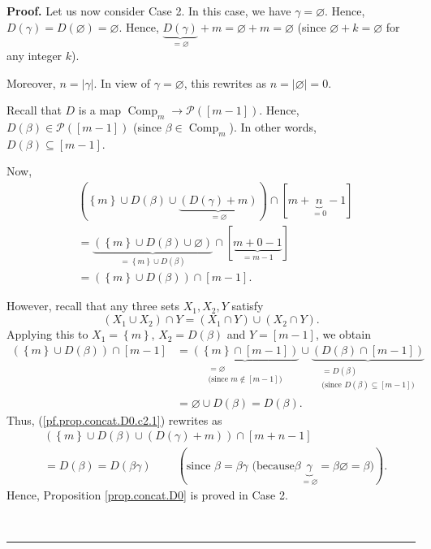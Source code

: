 \documentclass[numbers=enddot,12pt,final,onecolumn,notitlepage]{scrartcl}%
\theoremstyle{definition}
\newenvironment{proof}[1][Proof]{\noindent\textbf{#1.} }{\ \rule{0.5em}{0.5em}}
\begin{document}
\begin{proof}
Let us now consider Case 2. In this case, we have $\gamma=\varnothing$. Hence,
$D\left(  \gamma\right)  =D\left(  \varnothing\right)  =\varnothing$. Hence,
$\underbrace{D\left(  \gamma\right)  }_{=\varnothing}+m=\varnothing
+m=\varnothing$ (since $\varnothing+k=\varnothing$ for any integer $k$).

Moreover, $n=\left\vert \gamma\right\vert $. In view of $\gamma=\varnothing$,
this rewrites as $n=\left\vert \varnothing\right\vert =0$.

Recall that $D$ is a map $\operatorname*{Comp}\nolimits_{m}\rightarrow
\mathcal{P}\left(  \left[  m-1\right]  \right)  $. Hence, $D\left(
\beta\right)  \in\mathcal{P}\left(  \left[  m-1\right]  \right)  $ (since
$\beta\in\operatorname*{Comp}\nolimits_{m}$). In other words, $D\left(
\beta\right)  \subseteq\left[  m-1\right]  $.

Now,%
\begin{align}
&  \left(  \left\{  m\right\}  \cup D\left(  \beta\right)  \cup
\underbrace{\left(  D\left(  \gamma\right)  +m\right)  }_{=\varnothing
}\right)  \cap\left[  m+\underbrace{n}_{=0}-1\right] \nonumber\\
&  =\underbrace{\left(  \left\{  m\right\}  \cup D\left(  \beta\right)
\cup\varnothing\right)  }_{=\left\{  m\right\}  \cup D\left(  \beta\right)
}\cap\left[  \underbrace{m+0-1}_{=m-1}\right] \nonumber\\
&  =\left(  \left\{  m\right\}  \cup D\left(  \beta\right)  \right)
\cap\left[  m-1\right]  . \label{pf.prop.concat.D0.c2.1}%
\end{align}


However, recall that any three sets $X_{1},X_{2},Y$ satisfy%
\[
\left(  X_{1}\cup X_{2}\right)  \cap Y=\left(  X_{1}\cap Y\right)  \cup\left(
X_{2}\cap Y\right)  .
\]
Applying this to $X_{1}=\left\{  m\right\}  $, $X_{2}=D\left(  \beta\right)  $
and $Y=\left[  m-1\right]  $, we obtain%
\begin{align*}
\left(  \left\{  m\right\}  \cup D\left(  \beta\right)  \right)  \cap\left[
m-1\right]   &  =\underbrace{\left(  \left\{  m\right\}  \cap\left[
m-1\right]  \right)  }_{\substack{=\varnothing\\\text{(since }m\notin\left[
m-1\right]  \text{)}}}\cup\underbrace{\left(  D\left(  \beta\right)
\cap\left[  m-1\right]  \right)  }_{\substack{=D\left(  \beta\right)
\\\text{(since }D\left(  \beta\right)  \subseteq\left[  m-1\right]  \text{)}%
}}\\
&  =\varnothing\cup D\left(  \beta\right)  =D\left(  \beta\right)  .
\end{align*}
Thus, (\ref{pf.prop.concat.D0.c2.1}) rewrites as%
\begin{align*}
&  \left(  \left\{  m\right\}  \cup D\left(  \beta\right)  \cup\left(
D\left(  \gamma\right)  +m\right)  \right)  \cap\left[  m+n-1\right] \\
&  =D\left(  \beta\right)  =D\left(  \beta\gamma\right)
\ \ \ \ \ \ \ \ \ \ \left(  \text{since }\beta=\beta\gamma\text{ (because
}\beta\underbrace{\gamma}_{=\varnothing}=\beta\varnothing=\beta\text{)}%
\right)  .
\end{align*}
Hence, Proposition \ref{prop.concat.D0} is proved in Case 2.


\end{proof}
\end{document}
